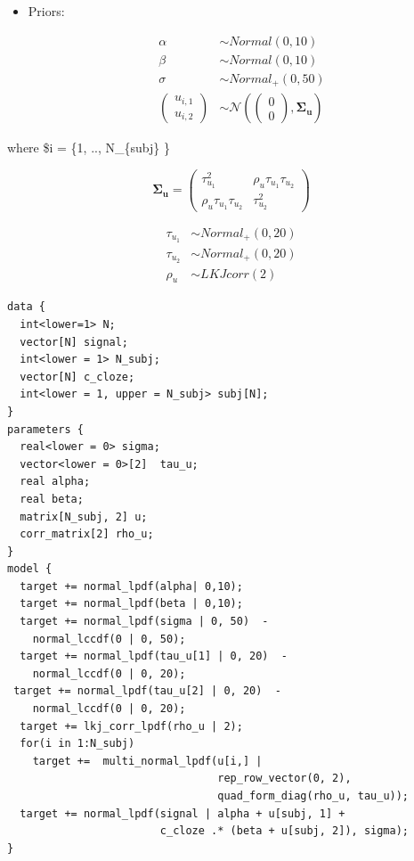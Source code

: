 \documentclass[12pt,]{krantz}
\providecommand{\tightlist}{%
  \setlength{\itemsep}{0pt}\setlength{\parskip}{0pt}}
\theoremstyle{definition}
\theoremstyle{definition}
\theoremstyle{definition}
\theoremstyle{remark}
\begin{document}
\begin{itemize}
\tightlist
\item
  Priors:

  \begin{equation}
   \begin{aligned} 
     \alpha & \sim Normal(0,10) \\
     \beta  & \sim Normal(0,10) \\
  \sigma  &\sim Normal_+(0,50)\\
  {\begin{pmatrix}
  u_{i,1} \\
  u_{i,2}
  \end{pmatrix}}
     &\sim {\mathcal {N}}
  \left(
     {\begin{pmatrix} 
  0\\
  0
     \end{pmatrix}}
   ,\boldsymbol{\Sigma_u} \right)
   \end{aligned}
   \end{equation}
\end{itemize}

where \$i = \{1, .., N\_\{subj\} \}

\begin{equation}
\boldsymbol{\Sigma_u} = 
{\begin{pmatrix} 
\tau_{u_1}^2 & \rho_u \tau_{u_1} \tau_{u_2} \\ 
\rho_u \tau_{u_1} \tau_{u_2} & \tau_{u_2}^2
\end{pmatrix}}
\end{equation}

\begin{equation}
\begin{aligned}
\tau_{u_1} &\sim Normal_+(0,20)\\
\tau_{u_2} &\sim Normal_+(0,20)\\
\rho_u &\sim LKJcorr(2) 
\end{aligned}
\end{equation}

\begin{verbatim}
data {
  int<lower=1> N;
  vector[N] signal;
  int<lower = 1> N_subj;
  vector[N] c_cloze;
  int<lower = 1, upper = N_subj> subj[N]; 
}
parameters {
  real<lower = 0> sigma;
  vector<lower = 0>[2]  tau_u;   
  real alpha;
  real beta;
  matrix[N_subj, 2] u;
  corr_matrix[2] rho_u;
}
model {
  target += normal_lpdf(alpha| 0,10);
  target += normal_lpdf(beta | 0,10);
  target += normal_lpdf(sigma | 0, 50)  -
    normal_lccdf(0 | 0, 50);
  target += normal_lpdf(tau_u[1] | 0, 20)  - 
    normal_lccdf(0 | 0, 20);
 target += normal_lpdf(tau_u[2] | 0, 20)  - 
    normal_lccdf(0 | 0, 20);
  target += lkj_corr_lpdf(rho_u | 2);
  for(i in 1:N_subj)
    target +=  multi_normal_lpdf(u[i,] |
                                 rep_row_vector(0, 2),
                                 quad_form_diag(rho_u, tau_u));
  target += normal_lpdf(signal | alpha + u[subj, 1] +
                        c_cloze .* (beta + u[subj, 2]), sigma);
}
\end{verbatim}
\end{document}
